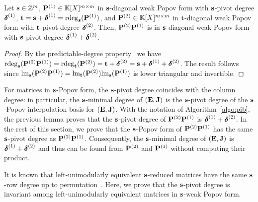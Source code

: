 \documentclass[preprint]{sig-alternate-05-2015}
\begin{document}
\begin{lem}
\label{lem:pivdegs}
Let $\shifts \in \shiftSpace$, $\intBasis^{(1)} \in \polMatSpace[\rdim]$ in
$\shifts$-diagonal weak Popov form with $\shifts$-pivot degree
$\minDegs^{(1)}$, $\shifts[t] = \shifts + \minDegs^{(1)} =
\rdeg[\shifts]{\intBasis^{(1)}}$, and $\intBasis^{(2)} \in \polMatSpace[\rdim]$
in $\shifts[t]$-diagonal weak Popov form with $\shifts[t]$-pivot degree
$\minDegs^{(2)}$. Then, $\intBasis^{(2)} \intBasis^{(1)}$ is in $\shifts$-diagonal weak Popov
form with $\shifts$-pivot degree $\minDegs^{(1)} + \minDegs^{(2)}$.
\end{lem}
\begin{proof}
By the predictable-degree property~\cite[Theorem~6.3-13]{Kailath80} we have
$\rdeg[\shifts]{\intBasis^{(2)} \intBasis^{(1)}} =
\rdeg[{\shifts[t]}]{\intBasis^{(2)}} = \shifts[t] + \minDegs^{(2)} = \shifts +
\minDegs^{(1)} + \minDegs^{(2)}$. The result follows since
$\leadingMat[\shifts]{ \intBasis^{(2)} \intBasis^{(1)} } =
\leadingMat[{\shifts[t]}]{\intBasis^{(2)}}
\leadingMat[\shifts]{\intBasis^{(1)}}$ is lower triangular and invertible.
\end{proof}

For matrices in $\shifts$-Popov form, the $\shifts$-pivot degree coincides with
the column degree: in particular, the $\shifts$-minimal degree of
$(\evMat,\mulmat)$ is the $\shifts$-pivot degree of the $\shifts$-Popov
interpolation basis for $(\evMat,\mulmat)$. With the notation of
Algorithm~\ref{algo:pib}, the previous lemma proves that the $\shifts$-pivot
degree of $\intBasis^{(2)} \intBasis^{(1)}$ is $\minDegs^{(1)} +
\minDegs^{(2)}$. In the rest of this section, we prove that the $\shifts$-Popov
form of $\intBasis^{(2)} \intBasis^{(1)}$ has the same $\shifts$-pivot degree
as $\intBasis^{(2)} \intBasis^{(1)}$. Consequently, the $\shifts$-minimal
degree of $(\evMat,\mulmat)$ is $\minDegs^{(1)} + \minDegs^{(2)}$ and thus can
be found from $\intBasis^{(2)}$ and $\intBasis^{(1)}$ without computing their
product.

It is known that left-unimodularly equivalent $\shifts$-reduced matrices have
the same $\shifts$-row degree up to permutation~\cite[Lemma~6.3-14]{Kailath80}.
Here, we prove that the $\shifts$-pivot degree is invariant among
left-unimodularly equivalent matrices in $\shifts$-weak Popov form.
\end{document}
